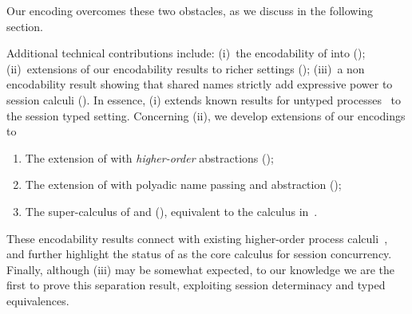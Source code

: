 
\noi
Our encoding overcomes these two obstacles, as we discuss in the following section.

Additional technical contributions include: 
(i)~the encodability of \HO into \sessp (); 
(ii)~extensions of our encodability results to richer settings ();
(iii)~a non encodability result showing that shared names strictly add expressive power to session calculi ().
In essence, (i) extends known  results for untyped processes~\cite{SangiorgiD:expmpa} to the session typed setting.
Concerning (ii), we develop extensions of our encodings to 
\begin{enumerate}[-]
\item The extension of \HOp with \emph{higher-order} abstractions (\HOpp); 
\item The extension of \HOp with polyadic name passing and abstraction (\PHOp); 
\item The super-calculus of \HOpp and \PHOp (\PHOpp), equivalent to the calculus in~\cite{tlca07}.
\end{enumerate}
These
encodability results connect \HOp with existing higher-order process calculi~\cite{tlca07}, and  
further highlight the status of \HO as the core calculus for session concurrency.
Finally, although (iii) may be somewhat expected, to our knowledge we are the first to prove this separation result, 
exploiting session determinacy and typed equivalences.




